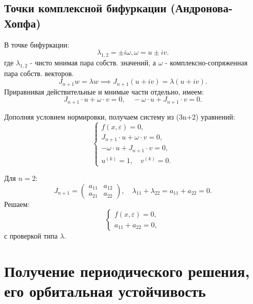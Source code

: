 	\subsection{Точки комплексной бифуркации (Андронова-Хопфа)}
	
	В точке бифуркации: 
	\begin{equation}
	\lambda_{1,2} = \pm i \omega, \omega = u \pm i v.
	\end{equation}
	где \(\lambda_{1,2}\) - чисто мнимая пара собств. значений, а \(\omega\) - комплексно-сопряженная пара собств. векторов.
	\begin{equation}
		J_{n+1} w = \lambda w \implies J_{n+1} (u + i v) = \lambda (u + i v).
	\end{equation}
	Приравнивая действительные и мнимые части отдельно, имеем:
	\begin{equation}
		J_{n+1} \cdot u + \omega \cdot v = 0, \quad -\omega \cdot u + J_{n+1} \cdot v = 0.
	\end{equation}
	\par
	Дополняя условием нормировки, получаем систему из (3n+2) уравнений:
	\begin{equation}
		\begin{cases}
			f(x, \varepsilon) = 0, \\
			J_{n+1} \cdot u + \omega \cdot v = 0, \\
			-\omega \cdot u + J_{n+1} \cdot v = 0, \\
			u^{(k)} = 1, \quad v^{(k)} = 0.
		\end{cases}
	\end{equation}
	
	Для \( n = 2 \):
	\begin{equation}
		J_{n+1} = \begin{pmatrix} a_{11} & a_{12} \\ a_{21} & a_{22} \end{pmatrix}, \quad \lambda_{11} + \lambda_{22} = a_{11} + a_{22} = 0.
	\end{equation}
	Решаем:
	\begin{equation}
		\begin{cases}
			f(x, \varepsilon) = 0, \\
			a_{11} + a_{22} = 0,
		\end{cases}
	\end{equation}
	с проверкой типа \(\lambda\).
	
	\newpage
	
	\section{Получение периодического решения, его орбитальная устойчивость}
